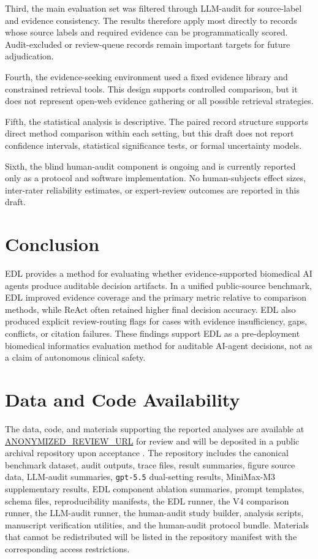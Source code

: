 \documentclass[11pt,a4paper]{article}
\begin{document}
Third, the main evaluation set was filtered through LLM-audit for source-label and evidence consistency. The results therefore apply most directly to records whose source labels and required evidence can be programmatically scored. Audit-excluded or review-queue records remain important targets for future adjudication.

Fourth, the evidence-seeking environment used a fixed evidence library and constrained retrieval tools. This design supports controlled comparison, but it does not represent open-web evidence gathering or all possible retrieval strategies.

Fifth, the statistical analysis is descriptive. The paired record structure supports direct method comparison within each setting, but this draft does not report confidence intervals, statistical significance tests, or formal uncertainty models.

Sixth, the blind human-audit component is ongoing and is currently reported only as a protocol and software implementation. No human-subjects effect sizes, inter-rater reliability estimates, or expert-review outcomes are reported in this draft.

\section{Conclusion}

EDL provides a method for evaluating whether evidence-supported biomedical AI agents produce auditable decision artifacts. In a unified public-source benchmark, EDL improved evidence coverage and the primary metric relative to comparison methods, while ReAct often retained higher final decision accuracy. EDL also produced explicit review-routing flags for cases with evidence insufficiency, gaps, conflicts, or citation failures. These findings support EDL as a pre-deployment biomedical informatics evaluation method for auditable AI-agent decisions, not as a claim of autonomous clinical safety.

\section*{Data and Code Availability}

The data, code, and materials supporting the reported analyses are available at \url{ANONYMIZED_REVIEW_URL} for review and will be deposited in a public archival repository upon acceptance \cite{eviagent2026artifacts,eviagent2026software}. The repository includes the canonical benchmark dataset, audit outputs, trace files, result summaries, figure source data, LLM-audit summaries, \texttt{gpt-5.5} dual-setting results, MiniMax-M3 supplementary results, EDL component ablation summaries, prompt templates, schema files, reproducibility manifests, the EDL runner, the V4 comparison runner, the LLM-audit runner, the human-audit study builder, analysis scripts, manuscript verification utilities, and the human-audit protocol bundle. Materials that cannot be redistributed will be listed in the repository manifest with the corresponding access restrictions.
\end{document}

